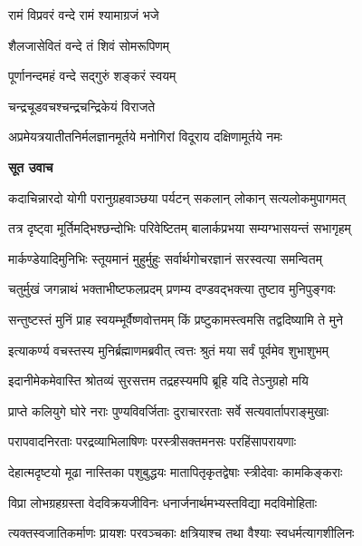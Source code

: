 


{रामं विप्रवरं वन्दे रामं श्यामाग्रजं भजे}

{शैलजासेवितं वन्दे तं शिवं सोमरूपिणम्}

{पूर्णानन्दमहं वन्दे सद्गुरुं शङ्करं स्वयम्}

{चन्द्रचूडवचश्चन्द्रचन्द्रिकेयं विराजते}

\twolineshloka
{अप्रमेयत्रयातीतनिर्मलज्ञानमूर्तये}
{मनोगिरां विदूराय दक्षिणामूर्तये नमः} %

\textbf{सूत उवाच}

\twolineshloka
{कदाचिन्नारदो योगी परानुग्रहवाञ्छया}
{पर्यटन् सकलान् लोकान् सत्यलोकमुपागमत्} %

\twolineshloka
{तत्र दृष्ट्वा मूर्तिमद्भिश्छन्दोभिः परिवेष्टितम्}
{बालार्कप्रभया सम्यग्भासयन्तं सभागृहम्} %

\twolineshloka
{मार्कण्डेयादिमुनिभिः स्तूयमानं मुहुर्मुहुः}
{सर्वार्थगोचरज्ञानं सरस्वत्या समन्वितम्} %

\twolineshloka
{चतुर्मुखं जगन्नाथं भक्ताभीष्टफलप्रदम्}
{प्रणम्य दण्डवद्भक्त्या तुष्टाव मुनिपुङ्गवः} %

\twolineshloka
{सन्तुष्टस्तं मुनिं प्राह स्वयम्भूर्वैष्णवोत्तमम्}
{किं प्रष्टुकामस्त्वमसि तद्वदिष्यामि ते मुने} %

\twolineshloka
{इत्याकर्ण्य वचस्तस्य मुनिर्ब्रह्माणमब्रवीत्}
{त्वत्तः श्रुतं मया सर्वं पूर्वमेव शुभाशुभम्} %

\twolineshloka
{इदानीमेकमेवास्ति श्रोतव्यं सुरसत्तम}
{तद्रहस्यमपि ब्रूहि यदि तेऽनुग्रहो मयि} %

\twolineshloka
{प्राप्ते कलियुगे घोरे नराः पुण्यविवर्जिताः}
{दुराचाररताः सर्वे सत्यवार्तापराङ्मुखाः} %

\twolineshloka
{परापवादनिरताः परद्रव्याभिलाषिणः}
{परस्त्रीसक्तमनसः परहिंसापरायणाः} %

\twolineshloka
{देहात्मदृष्टयो मूढा नास्तिका पशुबुद्धयः}
{मातापितृकृतद्वेषाः स्त्रीदेवाः कामकिङ्कराः} %

\twolineshloka
{विप्रा लोभग्रहग्रस्ता वेदविक्रयजीविनः}
{धनार्जनार्थमभ्यस्तविद्या मदविमोहिताः} %

\twolineshloka
{त्यक्तस्वजातिकर्माणः प्रायशः परवञ्चकाः}
{क्षत्रियाश्च तथा वैश्याः स्वधर्मत्यागशीलिनः} %

